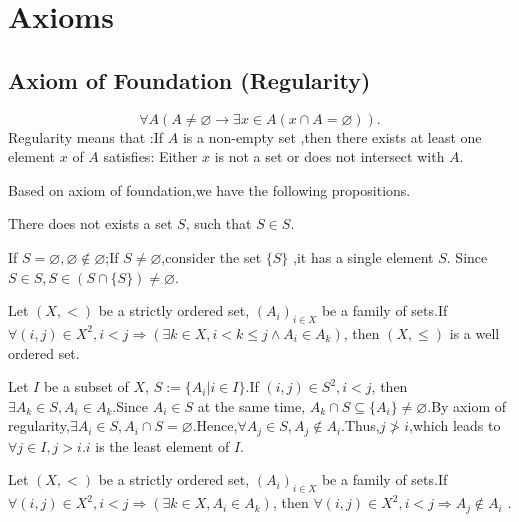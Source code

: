 \documentclass{book}
\numberwithin{equation}{section}
\begin{document}
\appendix












\chapter{Axioms}

\section{Axiom of Foundation (Regularity)}

\begin{axiomenv}
    $$\forall A(A\not=\varnothing\rightarrow\exists x\in A(x\cap A=\varnothing)).$$
    Regularity means that :If $A$ is a non-empty set ,then there exists at least one element $x$ of $A$ satisfies: Either $x$ is not a set or does not intersect with $A$.
\end{axiomenv}
Based on axiom of foundation,we have the following propositions.
\begin{propositionenv}
    
    There does not exists a set $S$, such that $S\in S$.
\end{propositionenv}
\begin{proofenv}
    If $S=\varnothing,\varnothing\notin\varnothing$;If $S\not=\varnothing$,consider the set $\{S\}$ ,it has a single element $S$. Since $S\in S,S\in (S\cap\{S\})\not=\varnothing$.
\end{proofenv}
\begin{propositionenv}

    Let $(X,<)$ be a strictly ordered set, $(A_i)_{i\in X}$ be a family of sets.If $\forall (i,j)\in X^2,i<j\Rightarrow(\exists k\in X,i<k\le j\wedge A_i\in A_k)$, then $(X,\le)$ is a well ordered set.
\end{propositionenv}
\begin{proofenv}
    
    Let $I$ be a subset of $X$, $S:=\{A_i|i\in I\}$.If $(i,j)\in S^2,i<j$, then $\exists A_k\in S,A_i\in A_k$.Since $A_i\in S$ at the same time, $A_k\cap S\subseteq\{A_i\}\not=\varnothing$.By axiom of regularity,$\exists A_i\in S,A_i\cap S=\varnothing$.Hence,$\forall A_j\in S,A_j\notin A_i$.Thus,$j\not>i$,which leads to $\forall j\in I, j>i$.$i$ is the least element of $I$.
\end{proofenv}
\begin{propositionenv}
   Let $(X,<)$ be a strictly ordered set, $(A_i)_{i\in X}$ be a family of sets.If $\forall (i,j)\in X^2,i<j\Rightarrow(\exists k\in X, A_i\in A_k)$, then $\forall (i,j)\in X^2,i<j\Rightarrow A_j\notin A_i$ .
\end{propositionenv}
\end{document}
